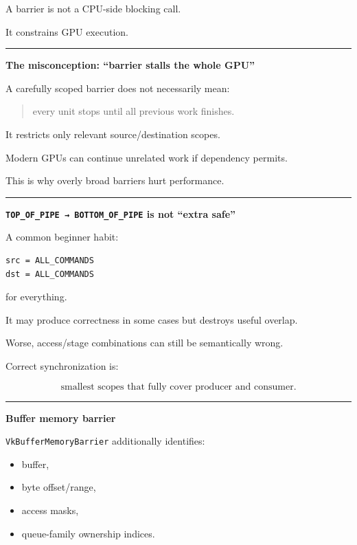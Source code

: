 A barrier is not a CPU-side blocking call.

It constrains GPU execution.

\begin{center}\rule{0.5\linewidth}{0.5pt}\end{center}

\textbf{The misconception: ``barrier stalls the whole GPU''}

A carefully scoped barrier does not necessarily mean:

\begin{quote}
every unit stops until all previous work finishes.
\end{quote}

It restricts only relevant source/destination scopes.

Modern GPUs can continue unrelated work if dependency permits.

This is why overly broad barriers hurt performance.

\begin{center}\rule{0.5\linewidth}{0.5pt}\end{center}

\textbf{\texttt{TOP\_OF\_PIPE\ →\ BOTTOM\_OF\_PIPE} is not ``extra safe''}

A common beginner habit:

\begin{verbatim}
src = ALL_COMMANDS
dst = ALL_COMMANDS
\end{verbatim}

for everything.

It may produce correctness in some cases but destroys useful overlap.

Worse, access/stage combinations can still be semantically wrong.

Correct synchronization is:

\[
\boxed{
\text{smallest scopes that fully cover producer and consumer}.
}
\]

\begin{center}\rule{0.5\linewidth}{0.5pt}\end{center}

\textbf{Buffer memory barrier}

\texttt{VkBufferMemoryBarrier} additionally identifies:

\begin{itemize}
\tightlist
\item
  buffer,
\item
  byte offset/range,
\item
  access masks,
\item
  queue-family ownership indices.
\end{itemize}

